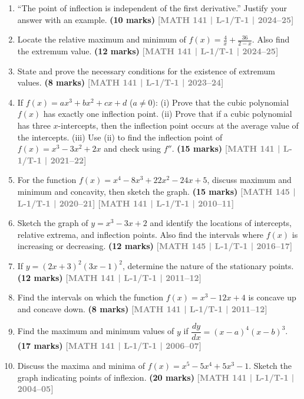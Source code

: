 \documentclass[12pt,a3paper]{article}
\newcommand{\yr}[1]{\hfill\textcolor{gray}{\small\textbf{[#1]}}}
\newcommand{\mk}[1]{\textcolor{orange!70!black}{\small\textbf{(#1 marks)}}}
\begin{document}
\begin{enumerate}

\item ``The point of inflection is independent of the first derivative.'' Justify your answer with an example.
\mk{10} \yr{MATH 141 | L-1/T-1 | 2024--25}

\item Locate the relative maximum and minimum of $\displaystyle f(x)=\frac{4}{x}+\frac{36}{2-x}$. Also find the extremum value.
\mk{12}  \yr{MATH 141 | L-1/T-1 | 2024--25}

\item State and prove the necessary conditions for the existence of extremum values.
\mk{8} \yr{MATH 141 | L-1/T-1 | 2023--24}

\item If $f(x)=ax^{3}+bx^{2}+cx+d$ ($a\neq 0$): (i) Prove that the cubic polynomial $f(x)$ has exactly one inflection point. (ii) Prove that if a cubic polynomial has three $x$-intercepts, then the inflection point occurs at the average value of the intercepts. (iii) Use (ii) to find the inflection point of $f(x)=x^{3}-3x^{2}+2x$ and check using $f''$.
\mk{15} \yr{MATH 141 | L-1/T-1 | 2021--22}

\item For the function $f(x)=x^{4}-8x^{3}+22x^{2}-24x+5$, discuss maximum and minimum and concavity, then sketch the graph.
\mk{15} \yr{MATH 145 | L-1/T-1 | 2020--21} \yr{MATH 141 | L-1/T-1 | 2010--11}

\item Sketch the graph of $y=x^{3}-3x+2$ and identify the locations of intercepts, relative extrema, and inflection points. Also find the intervals where $f(x)$ is increasing or decreasing.
\mk{12} \yr{MATH 145 | L-1/T-1 | 2016--17}

\item If $y=(2x+3)^{2}(3x-1)^{2}$, determine the nature of the stationary points.
\mk{12} \yr{MATH 141 | L-1/T-1 | 2011--12}

\item Find the intervals on which the function $f(x)=x^{3}-12x+4$ is concave up and concave down.
\mk{8} \yr{MATH 141 | L-1/T-1 | 2011--12}

\item Find the maximum and minimum values of $y$ if $\dfrac{dy}{dx}=(x-a)^{4}(x-b)^{3}$.
\mk{17} \yr{MATH 141 | L-1/T-1 | 2006--07}

\item Discuss the maxima and minima of $f(x)=x^{5}-5x^{4}+5x^{3}-1$. Sketch the graph indicating points of inflexion.
\mk{20} \yr{MATH 141 | L-1/T-1 | 2004--05}

\end{enumerate}
\end{document}
